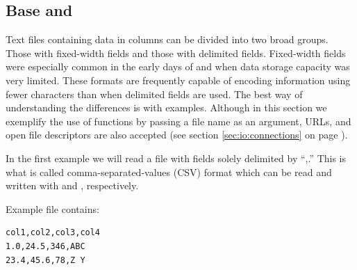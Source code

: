 \documentclass[krantz2]{krantz}\usepackage{knitr}
\begin{document}
\subsection[Base R and `utils']{Base \Rlang and }
Text files containing data in columns can be divided into two broad groups. Those with fixed-width fields and those with delimited fields. Fixed-width fields were especially common in the early days of  and  when data storage capacity was very limited. These formats are frequently capable of encoding information using fewer characters than when delimited fields are used. The best way of understanding the differences is with examples. Although in this section we exemplify the use of functions by passing a file name as an argument, URLs, and open file descriptors are also accepted (see section \ref{sec:io:connections} on page \pageref{sec:io:connections}).

In the first example we will read a file with fields solely delimited by ``,.'' This is what is called comma-separated-values (CSV) format which can be read and written with  and , respectively.

Example file  contains:

\begin{knitrout}\footnotesize
{}\color{fgcolor}\begin{kframe}
\begin{verbatim}
col1,col2,col3,col4
1.0,24.5,346,ABC
23.4,45.6,78,Z Y
\end{verbatim}
\end{kframe}
\end{knitrout}

\begin{knitrout}\footnotesize
{}\color{fgcolor}\begin{kframe}
\begin{alltt}
 \hlkwb{<-} \hlstd{(}\hlstd{)}
\end{alltt}
\end{kframe}
\end{knitrout}
\end{document}
